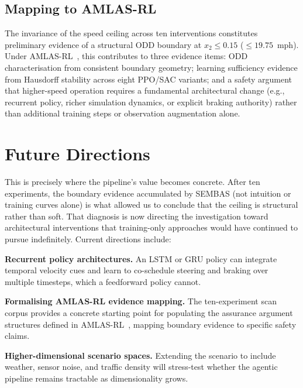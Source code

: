 \documentclass[conference]{IEEEtran}
\begin{document}
\subsection{Mapping to AMLAS-RL}

The invariance of the speed ceiling across ten interventions constitutes
preliminary evidence of a structural ODD boundary at $x_2 \leq 0.15$
(${\leq}19.75$~mph). Under AMLAS-RL~\cite{b3}, this contributes to three
evidence items: ODD characterisation from consistent boundary geometry;
learning sufficiency evidence from Hausdorff stability across eight PPO/SAC
variants; and a safety argument that higher-speed operation requires a
fundamental architectural change (e.g., recurrent policy, richer simulation
dynamics, or explicit braking authority) rather than additional training steps
or observation augmentation alone.

\section{Future Directions}

This is precisely where the pipeline's value becomes concrete. After ten
experiments, the boundary evidence accumulated by SEMBAS (not intuition or
training curves alone) is what allowed us to conclude that the ceiling is
structural rather than soft. That diagnosis is now directing the investigation
toward architectural interventions that training-only approaches would have
continued to pursue indefinitely. Current directions include:

\textbf{Recurrent policy architectures.} An LSTM or GRU policy can integrate
temporal velocity cues and learn to co-schedule steering and braking over
multiple timesteps, which a feedforward policy cannot.

\textbf{Formalising AMLAS-RL evidence mapping.} The ten-experiment scan corpus
provides a concrete starting point for populating the assurance argument
structures defined in AMLAS-RL~\cite{b3}, mapping boundary evidence to
specific safety claims.

\textbf{Higher-dimensional scenario spaces.} Extending the scenario to include
weather, sensor noise, and traffic density will stress-test whether the agentic
pipeline remains tractable as dimensionality grows.
\end{document}

